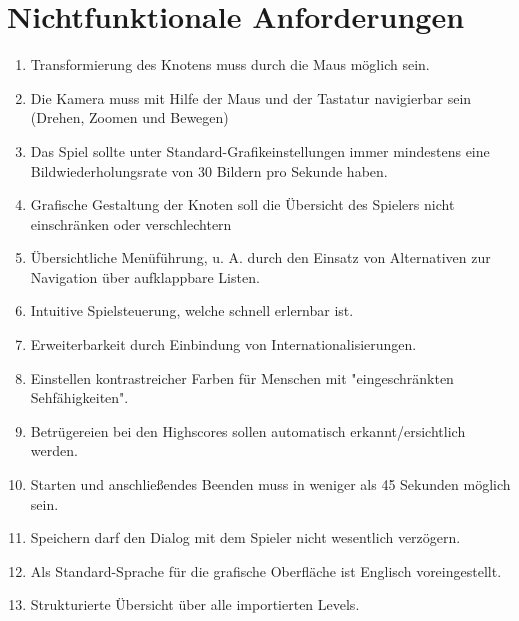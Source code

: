 \chapter{Nichtfunktionale Anforderungen}

\renewcommand{\theenumi}{/NF\_\arabic{enumi}0/}
\renewcommand{\labelenumi}{\theenumi}

\begin{enumerate}

\item Transformierung des Knotens muss durch die Maus möglich sein.
\item Die Kamera muss mit Hilfe der Maus und der Tastatur navigierbar sein (Drehen, Zoomen und Bewegen)
\item Das Spiel sollte unter Standard-Grafikeinstellungen immer mindestens eine Bildwiederholungsrate von 30 Bildern pro Sekunde haben.
\item Grafische Gestaltung der Knoten soll die Übersicht des Spielers nicht einschränken oder verschlechtern  
\item Übersichtliche Menüführung, u. A. durch den Einsatz von Alternativen zur Navigation über aufklappbare Listen.
\item Intuitive Spielsteuerung, welche schnell erlernbar ist. 
\item Erweiterbarkeit durch Einbindung von Internationalisierungen. %
\item Einstellen kontrastreicher Farben für Menschen mit "eingeschränkten Sehfähigkeiten". %
\item Betrügereien bei den Highscores sollen automatisch erkannt/ersichtlich werden. %
\item Starten und anschließendes Beenden muss in weniger als 45 Sekunden möglich sein. %
\item Speichern darf den Dialog mit dem Spieler nicht wesentlich verzögern. 
\item Als Standard-Sprache für die grafische Oberfläche ist Englisch voreingestellt.
\item Strukturierte Übersicht über alle importierten Levels.

\end{enumerate}

